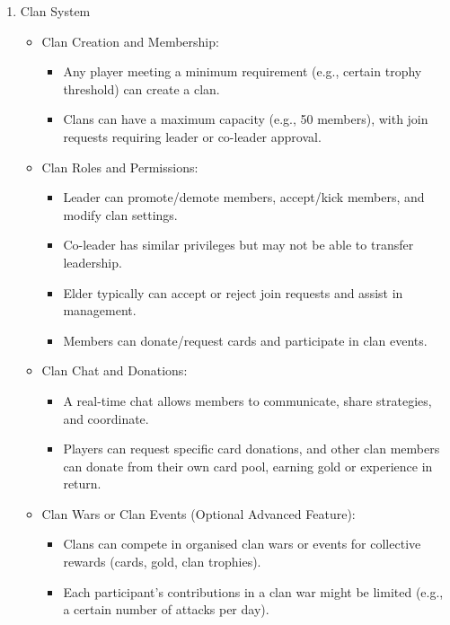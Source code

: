\documentclass{article}
\begin{document}
\begin{enumerate}[label=\textbf{FR\arabic*:}]
    \item Clan System
    \begin{itemize}
        \item Clan Creation and Membership:
        \begin{itemize}
            \item Any player meeting a minimum requirement (e.g., certain trophy threshold) can create a clan.
            \item Clans can have a maximum capacity (e.g., 50 members), with join requests requiring leader or co-leader approval.
        \end{itemize}
        \item Clan Roles and Permissions:
        \begin{itemize}
            \item Leader can promote/demote members, accept/kick members, and modify clan settings.
            \item Co-leader has similar privileges but may not be able to transfer leadership.
            \item Elder typically can accept or reject join requests and assist in management.
            \item Members can donate/request cards and participate in clan events.
        \end{itemize}
        \item Clan Chat and Donations:
        \begin{itemize}
            \item A real-time chat allows members to communicate, share strategies, and coordinate.
            \item Players can request specific card donations, and other clan members can donate from their own card pool, earning gold or experience in return.
        \end{itemize}
        \item Clan Wars or Clan Events (Optional Advanced Feature):
        \begin{itemize}
            \item Clans can compete in organised clan wars or events for collective rewards (cards, gold, clan trophies).
            \item Each participant’s contributions in a clan war might be limited (e.g., a certain number of attacks per day).
        \end{itemize}
    \end{itemize}
    

\end{enumerate}
\end{document}
